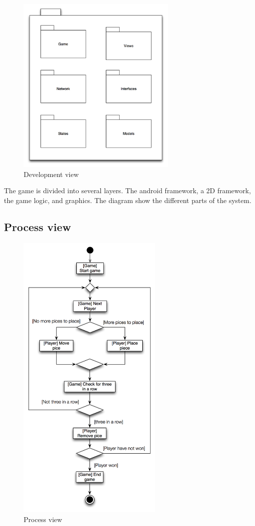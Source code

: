 \begin{figure}[H]
\begin{center}
\includegraphics[width=220pt]{./Images/DevelopmentView.png}
\end{center}
\caption{Development view}
\end{figure}

The game is divided into several layers. The android framework, a 2D framework, the game logic, and graphics. The diagram show the different parts of the system.

\pagebreak

\subsection{Process view}

\begin{figure}[H]
\begin{center}
\includegraphics[width=200pt]{./Images/ProcessView}
\end{center}
\caption{Process view}
\end{figure}

